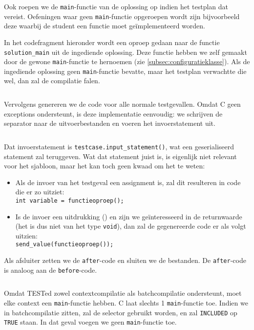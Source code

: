 Ook roepen we de \texttt{main}-functie van de oplossing op indien het testplan dat vereist.
Oefeningen waar geen \texttt{main}-functie opgeroepen wordt zijn bijvoorbeeld deze waarbij de student een functie moet geïmplementeerd worden.

In het codefragment hieronder wordt een oproep gedaan naar de functie \texttt{solution\_main} uit de ingediende oplossing.
Deze functie hebben we zelf gemaakt door de gewone \texttt{main}-functie te hernoemen (zie \cref{subsec:configuratieklasse}).
Als de ingediende oplossing geen \texttt{main}-functie bevatte, maar het testplan verwachtte die wel, dan zal de compilatie falen.

\inputminted[firstline=38,lastline=49]{mako}{sources/c-context.mako}

Vervolgens genereren we de code voor alle normale testgevallen.
Omdat C geen exceptions ondersteunt, is deze implementatie eenvoudig: we schrijven de separator naar de uitvoerbestanden en voeren het invoerstatement uit.

\inputminted[firstline=52,lastline=56]{mako}{sources/c-context.mako}

Dat invoerstatement is \texttt{testcase.input\_statement()}, wat een geserialiseerd statement zal teruggeven.
Wat dat statement juist is, is eigenlijk niet relevant voor het sjabloon, maar het kan toch geen kwaad om het te weten:

\begin{itemize}
    \item Als de invoer van het testgeval een assignment is, zal dit resulteren in code die er zo uitziet: \\
    \texttt{int variable = functieoproep();}
    
    \item Is de invoer een uitdrukking () en zijn we geïnteresseerd in de returnwaarde (het is dus niet van het type \texttt{void}), dan zal de gegenereerde code er als volgt uitzien: \\
    \texttt{send_value(functieoproep());}
\end{itemize}

Als afsluiter zetten we de \texttt{after}-code en sluiten we de bestanden.
De \texttt{after}-code is analoog aan de \texttt{before}-code.

\inputminted[firstline=58,lastline=63]{mako}{sources/c-context.mako}

Omdat TESTed zowel contextcompilatie als batchcompilatie ondersteunt, moet elke context een \texttt{main}-functie hebben.
C laat slechts 1 \texttt{main}-functie toe.
Indien we in batchcompilatie zitten, zal de selector gebruikt worden, en zal \texttt{INCLUDED} op \texttt{TRUE} staan.
In dat geval voegen we geen \texttt{main}-functie toe.

